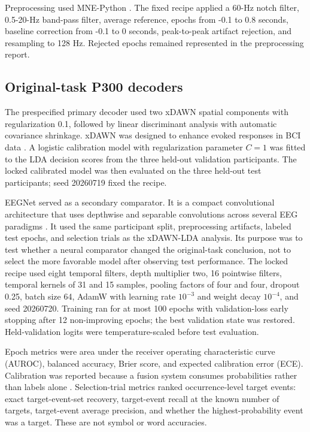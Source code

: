 \documentclass[11pt]{article}
\begin{document}
Preprocessing used MNE-Python \cite{gramfort2013}. The fixed recipe applied a 60-Hz notch filter, 0.5-20-Hz band-pass filter, average reference, epochs from -0.1 to 0.8 seconds, baseline correction from -0.1 to 0 seconds, peak-to-peak artifact rejection, and resampling to 128 Hz. Rejected epochs remained represented in the preprocessing report.


\subsection{Original-task P300 decoders}

The prespecified primary decoder used two xDAWN spatial components with regularization 0.1, followed by linear discriminant analysis with automatic covariance shrinkage. xDAWN was designed to enhance evoked responses in BCI data \cite{rivet2009}. A logistic calibration model with regularization parameter $C=1$ was fitted to the LDA decision scores from the three held-out validation participants. The locked calibrated model was then evaluated on the three held-out test participants; seed 20260719 fixed the recipe.


EEGNet served as a secondary comparator. It is a compact convolutional architecture that uses depthwise and separable convolutions across several EEG paradigms \cite{lawhern2018}. It used the same participant split, preprocessing artifacts, labeled test epochs, and selection trials as the xDAWN-LDA analysis. Its purpose was to test whether a neural comparator changed the original-task conclusion, not to select the more favorable model after observing test performance. The locked recipe used eight temporal filters, depth multiplier two, 16 pointwise filters, temporal kernels of 31 and 15 samples, pooling factors of four and four, dropout 0.25, batch size 64, AdamW with learning rate $10^{-3}$ and weight decay $10^{-4}$, and seed 20260720. Training ran for at most 100 epochs with validation-loss early stopping after 12 non-improving epochs; the best validation state was restored. Held-validation logits were temperature-scaled before test evaluation.


Epoch metrics were area under the receiver operating characteristic curve (AUROC), balanced accuracy, Brier score, and expected calibration error (ECE). Calibration was reported because a fusion system consumes probabilities rather than labels alone \cite{guo2017}. Selection-trial metrics ranked occurrence-level target events: exact target-event-set recovery, target-event recall at the known number of targets, target-event average precision, and whether the highest-probability event was a target. These are not symbol or word accuracies.
\end{document}
